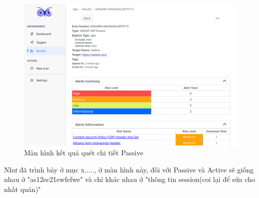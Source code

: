 \begin{figure}[H]
      \centering
      \includegraphics[width=\textwidth]{applied-thesis-chapters/chapter-6/Màn hình kết quả quét chi tiết Passive.png}
      \caption{Màn hình kết quả quét chi tiết Passive}
      \label{fig:ManHinhKetQuaQuetChiTietPassive}
\end{figure}

Như đã trình bày ở mục x....., ở màn hình này, đối với Passive và Active sẽ giống nhau ở "as12ec21ewfefwe" và chỉ khác nhau ở "thông tin session(coi lại để sửa cho nhất quán)"
